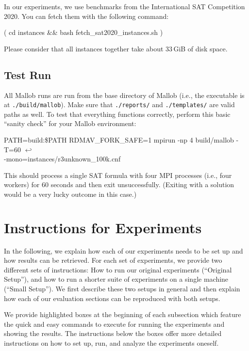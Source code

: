 \documentclass[runningheads]{article}
\newcommand{\CR}{{\tiny$\hookleftarrow$}}
\numberwithin{dummy}{subsection}
\begin{document}
In our experiments, we use benchmarks from the International SAT Competition 2020.
You can fetch them with the following command:
\begin{ttfenv}
( cd instances \&\& bash fetch\_sat2020\_instances.sh )
\end{ttfenv}
Please consider that all instances together take about 33$\,$GiB of disk space.

\subsection{Test Run}

All Mallob runs are run from the base directory of Mallob (i.e., the executable is at \texttt{./build/mallob}).
Make sure that \texttt{./reports/} and \texttt{./templates/} are valid paths as well.
To test that everything functions correctly, perform this basic ``sanity check'' for your Mallob environment:

\begin{ttfenv}
PATH=build:\$PATH RDMAV\_FORK\_SAFE=1 mpirun -np 4 build/mallob -T=60 \CR\\
-mono=instances/r3unknown\_100k.cnf
\end{ttfenv}

This should process a single SAT formula with four MPI processes (i.e., four workers) for 60 seconds and then exit unsuccessfully. (Exiting with a solution would be a very lucky outcome in this case.)








\section{Instructions for Experiments}

In the following, we explain how each of our experiments needs to be set up and how results can be retrieved.
For each set of experiments, we provide two different sets of instructions: How to run our original experiments (``Original Setup''), and how to run a shorter suite of experiments on a single machine (``Small Setup'').
We first describe these two setups in general and then explain how each of our evaluation sections can be reproduced with both setups.

We provide highlighted boxes at the beginning of each subsection which feature the quick and easy commands to execute for running the experiments and showing the results.
The instructions below the boxes offer more detailed instructions on how to set up, run, and analyze the experiments oneself.
\end{document}
